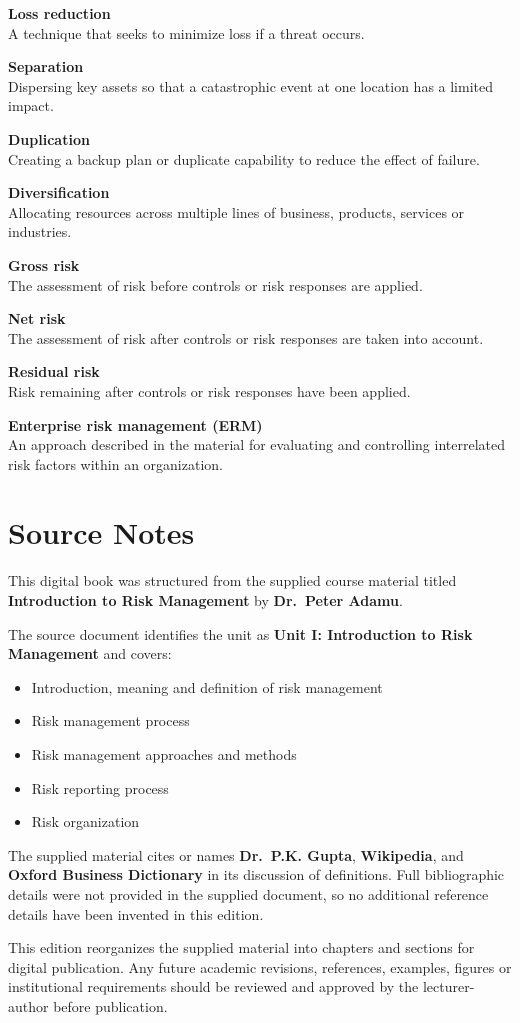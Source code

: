 \documentclass[
]{book}
\providecommand{\tightlist}{%
  \setlength{\itemsep}{0pt}\setlength{\parskip}{0pt}}
\begin{document}
\textbf{Loss reduction}\\
A technique that seeks to minimize loss if a threat occurs.

\textbf{Separation}\\
Dispersing key assets so that a catastrophic event at one location has a limited impact.

\textbf{Duplication}\\
Creating a backup plan or duplicate capability to reduce the effect of failure.

\textbf{Diversification}\\
Allocating resources across multiple lines of business, products, services or industries.

\textbf{Gross risk}\\
The assessment of risk before controls or risk responses are applied.

\textbf{Net risk}\\
The assessment of risk after controls or risk responses are taken into account.

\textbf{Residual risk}\\
Risk remaining after controls or risk responses have been applied.

\textbf{Enterprise risk management (ERM)}\\
An approach described in the material for evaluating and controlling interrelated risk factors within an organization.

\chapter*{Source Notes}\label{source-notes}

This digital book was structured from the supplied course material titled \textbf{Introduction to Risk Management} by \textbf{Dr.~Peter Adamu}.

The source document identifies the unit as \textbf{Unit I: Introduction to Risk Management} and covers:

\begin{itemize}
\tightlist
\item
  Introduction, meaning and definition of risk management
\item
  Risk management process
\item
  Risk management approaches and methods
\item
  Risk reporting process
\item
  Risk organization
\end{itemize}

The supplied material cites or names \textbf{Dr.~P.K. Gupta}, \textbf{Wikipedia}, and \textbf{Oxford Business Dictionary} in its discussion of definitions. Full bibliographic details were not provided in the supplied document, so no additional reference details have been invented in this edition.

This edition reorganizes the supplied material into chapters and sections for digital publication. Any future academic revisions, references, examples, figures or institutional requirements should be reviewed and approved by the lecturer-author before publication.
\end{document}
